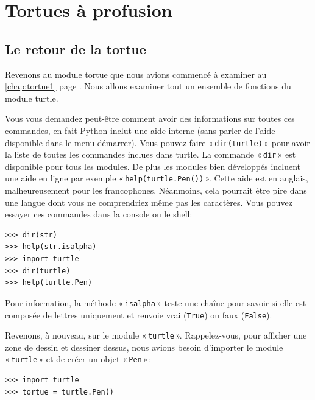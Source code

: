 




\chapter{Tortues à profusion\label{chap:tortue2}}
\section{Le retour de la tortue}
Revenons au module tortue que nous avions commencé à examiner au \autoref{chap:tortue1} page \pageref{chap:tortue1}. Nous allons examiner tout un ensemble de fonctions du module turtle. 

Vous vous demandez peut-être comment avoir des informations sur toutes ces commandes, en fait Python inclut une aide interne (sans parler de l'aide disponible dans le menu démarrer). Vous pouvez faire « \texttt{dir(turtle)} » pour avoir la liste de toutes les commandes inclues dans turtle. La commande « \texttt{dir} » est disponible pour tous les modules. De plus les modules bien développés incluent une aide en ligne par exemple « \texttt{help(turtle.Pen())} ». Cette aide est en anglais, malheureusement pour les francophones. Néanmoins, cela pourrait être pire dans une langue dont vous  ne comprendriez même pas les caractères. Vous pouvez essayer ces commandes dans la console ou le shell:

\begin{Verbatim}[frame=single,rulecolor=\color{mbleu}, label=à taper]
>>> dir(str)
>>> help(str.isalpha)
>>> import turtle
>>> dir(turtle)
>>> help(turtle.Pen)
\end{Verbatim}

Pour information, la méthode « \texttt{isalpha} » teste une chaîne pour savoir si elle est composée de lettres uniquement et renvoie vrai (\texttt{True}) ou faux (\texttt{False}).

Revenons, à  nouveau, sur le module « \texttt{turtle} ». Rappelez-vous, pour afficher une zone de dessin et dessiner dessus, nous avions besoin d'importer le module « \texttt{turtle} » et de créer un objet « \texttt{Pen} »:
\begin{Verbatim}[frame=single,rulecolor=\color{gray}, label=ne pas saisir]
>>> import turtle
>>> tortue = turtle.Pen()
\end{Verbatim}

